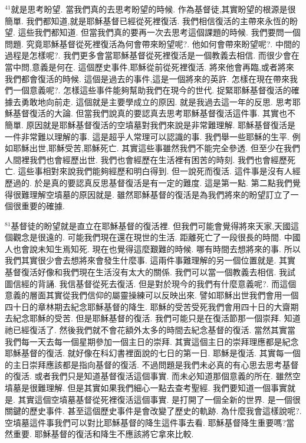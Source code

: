 \documentclass{book}
\begin{document}
$^{41}$就是思考盼望.
當我們真的去思考盼望的時候.
作為基督徒,其實盼望的根源是很簡單.
我們都知道,就是耶穌基督已經從死裡復活.
我們相信復活的主帶來永恆的盼望.
這些我們都知道.
但當我們真的要再一次去思考這個課題的時候.
我們要問一個問題.
究竟耶穌基督從死裡復活為何會帶來盼望呢?.
他如何會帶來盼望呢?.
中間的過程是怎樣呢?.
我們更多會當耶穌基督從死裡復活是一個教義去相信.
而很少會在當中問,意義是何在.
這個歷史事件,耶穌從前從死裡復活.
將來他會再臨,或者將來我們都會復活的時候.
這個是過去的事件,這是一個將來的英許.
怎樣在現在帶來我們一個意義呢?.
怎樣這些事件能夠幫助我們在現今的世代.
捉緊耶穌基督復活的確據去勇敢地向前走.
這個就是主要學成立的原因.
就是我過去這一年的反思.
思考耶穌基督復活的大論.
但當我們說真的要認真去思考耶穌基督復活這件事.
其實也不簡單.
原因就是耶穌基督復活的空墳墓對我們來說是非常難理解.
耶穌基督復活是一件非常難以理解的事.
這是超乎人常理可以認識的事.
我們舉一些耶穌的生平.
例如耶穌出世,耶穌受苦,耶穌死亡.
其實這些事雖然我們不能完全參透.
但至少在我們人間裡我們也會經歷出世.
我們也會經歷在生活裡有困苦的時刻.
我們也會經歷死亡.
這些事相對來說我們能夠經歷和明白得到.
但一說死而復活.
這件事是沒有人經歷過的.
於是真的要認真反思基督復活是有一定的難度.
這是第一點.
第二點我們覺得很難理解空墳墓的原因就是.
雖然耶穌基督的復活是為我們將來的盼望訂立了一個很重要的確據.

$^{81}$基督徒的盼望就是直立在耶穌基督的復活裡.
但我們可能會覺得將來天家,天國這個觀念是很遠的.
可能我們現在還在現世的生活.
距離死亡了一段很長的時間.
中國人也會說未知生焉知死.
現在也覺得這麼艱難的時候.
哪有時間去想將來的事.
所以我們其實很少會去想將來會發生什麼事.
這兩件事難理解的另一個位置就是.
其實基督復活好像和我們現在生活沒有太大的關係.
我們可以當一個教義去相信.
我試圖信經的背誦.
我信基督從死去復活.
但是對於現今的我們有什麼意義呢?.
而這個意義的層面其實從我們信仰的屬靈操練可以反映出來.
譬如耶穌出世我們會用一個四十日的章林期去紀念耶穌基督的降生.
耶穌的受苦受死我們會用四十日的大齋期去紀念耶穌的受苦.
但是耶穌基督的復活.
我們可能只是在復活節那一個崇拜.
知道祂已經復活了.
然後我們就不會花額外太多的時間去紀念基督的復活.
當然其實當我們每一天去每一個星期參加一個主日的崇拜.
其實這個主日的崇拜理應都是紀念耶穌基督的復活.
就好像在科幻書裡面說的七日的第一日.
耶穌是復活.
其實每一個的主日崇拜應該都是指向基督的復活.
不過問題是我們未必真的有心思去思考基督的復活.
或者我們只是知道基督復活這個事實.
而未必知道那個意義的所在.
雖然空墳墓是很難理解.
但是其實如果我們細心一點去查考聖經.
我們要知道一個事實就是.
其實這個空墳墓基督從死裡復活這個事實.
是打開了一個全新的世界.
是一個很關鍵的歷史事件.
甚至這個歷史事件是會改變了歷史的軌跡.
為什麼我會這樣說呢?.
空墳墓這件事我們可以對比耶穌基督的降生這件事去看.
耶穌基督降生重要嗎?當然重要.
耶穌基督的復活和降生不應該將它拿來比較.
\end{document}
